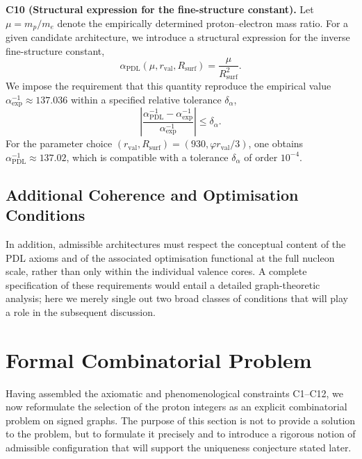\documentclass[11pt,a4paper]{article}
\begin{document}
\medskip
\noindent\textbf{C10 (Structural expression for the fine-structure constant).} Let $\mu=m_p/m_e$ denote the empirically determined proton–electron mass ratio. For a given candidate architecture, we introduce a structural expression for the inverse fine-structure constant,
\begin{equation}
\alpha_{\mathrm{PDL}}(\mu,r_{\mathrm{val}},R_{\mathrm{surf}}) = \frac{\mu}{R_{\mathrm{surf}}^{2}}.
\end{equation}
We impose the requirement that this quantity reproduce the empirical value $\alpha_{\mathrm{exp}}^{-1}\approx 137.036$ within a specified relative tolerance $\delta_{\alpha}$,
\begin{equation}
\left|\frac{\alpha_{\mathrm{PDL}}^{-1}-\alpha_{\mathrm{exp}}^{-1}}{\alpha_{\mathrm{exp}}^{-1}}\right| \leq \delta_{\alpha}.
\end{equation}
For the parameter choice $(r_{\mathrm{val}},R_{\mathrm{surf}})=(930,\varphi r_{\mathrm{val}}/3)$, one obtains $\alpha_{\mathrm{PDL}}^{-1}\approx 137.02$, which is compatible with a tolerance $\delta_{\alpha}$ of order $10^{-4}$.\cite{LaubscherDerivationAlpha2026}

\subsection{Additional Coherence and Optimisation Conditions}

In addition, admissible architectures must respect the conceptual content of the PDL axioms and of the associated optimisation functional at the full nucleon scale, rather than only within the individual valence cores. A complete specification of these requirements would entail a detailed graph-theoretic analysis; here we merely single out two broad classes of conditions that will play a role in the subsequent discussion.

\section{Formal Combinatorial Problem}
\label{sec:comb_problem}

Having assembled the axiomatic and phenomenological constraints C1–C12, we now reformulate the selection of the proton integers as an explicit combinatorial problem on signed graphs. The purpose of this section is not to provide a solution to the problem, but to formulate it precisely and to introduce a rigorous notion of admissible configuration that will support the uniqueness conjecture stated later.
\end{document}
